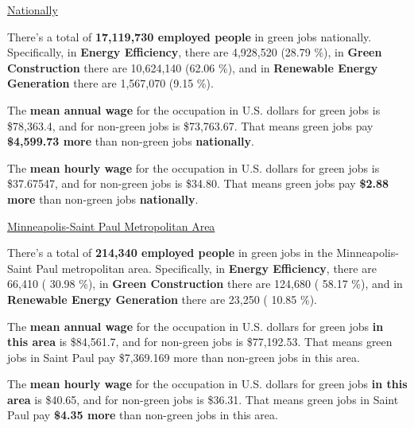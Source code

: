 \documentclass[
  letterpaper,
  DIV=11,
  numbers=noendperiod]{scrartcl}
\begin{document}
\begin{tcolorbox}[enhanced jigsaw, coltitle=black, opacitybacktitle=0.6, rightrule=.15mm, colframe=quarto-callout-note-color-frame, bottomtitle=1mm, title=\textcolor{quarto-callout-note-color}{\faInfo}\hspace{0.5em}{RQ 2: What specific green jobs are being created in the
Minneapolis-Saint Paul metropolitan area and nationally (e.g., energy
efficiency, renewable energy, green construction)?}, breakable, colback=white, toptitle=1mm, titlerule=0mm, arc=.35mm, opacityback=0, left=2mm, bottomrule=.15mm, toprule=.15mm, colbacktitle=quarto-callout-note-color!10!white, leftrule=.75mm]

\ul{Nationally}

There's a total of \textbf{17,119,730 employed people} in green jobs
nationally. Specifically, in \textbf{Energy Efficiency}, there are
4,928,520 (28.79 \%), in \textbf{Green Construction} there are
10,624,140 (62.06 \%), and in \textbf{Renewable Energy Generation} there
are 1,567,070 (9.15 \%).

The \textbf{mean annual wage} for the occupation in U.S. dollars for
green jobs is \$78,363.4, and for non-green jobs is \$73,763.67. That
means green jobs pay \textbf{\$4,599.73 more} than non-green jobs
\textbf{nationally}.

The \textbf{mean hourly wage} for the occupation in U.S. dollars for
green jobs is \$37.67547, and for non-green jobs is \$34.80. That means
green jobs pay \textbf{\$2.88 more} than non-green jobs
\textbf{nationally}.

\ul{Minneapolis-Saint Paul Metropolitan Area}

There's a total of \textbf{214,340 employed people} in green jobs in the
Minneapolis-Saint Paul metropolitan area. Specifically, in
\textbf{Energy Efficiency}, there are 66,410 ( 30.98 \%), in
\textbf{Green Construction} there are 124,680 ( 58.17 \%), and in
\textbf{Renewable Energy Generation} there are 23,250 ( 10.85 \%).

The \textbf{mean annual wage} for the occupation in U.S. dollars for
green jobs \textbf{in this area} is \$84,561.7, and for non-green jobs
is \$77,192.53. That means green jobs in Saint Paul pay \$7,369.169 more
than non-green jobs in this area.

The \textbf{mean hourly wage} for the occupation in U.S. dollars for
green jobs \textbf{in this area} is \$40.65, and for non-green jobs is
\$36.31. That means green jobs in Saint Paul pay \textbf{\$4.35 more}
than non-green jobs in this area.

\end{tcolorbox}
\end{document}
